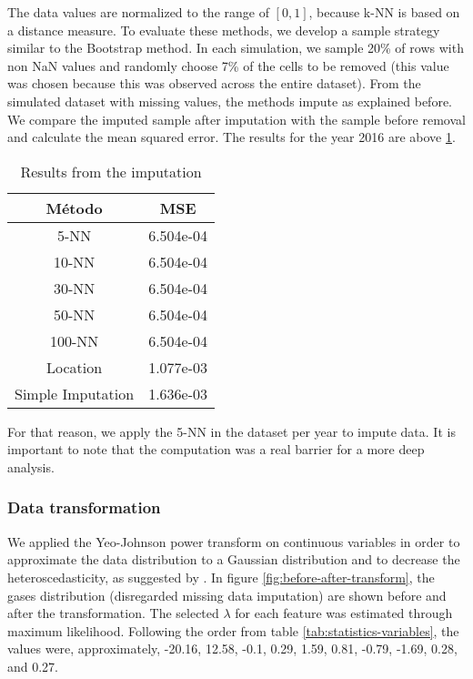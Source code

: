 The data values are normalized to the range of $[0,1]$, because k-NN is based
on a distance measure. To evaluate these methods, we develop a sample strategy
similar to the Bootstrap method. In each simulation, we sample 20\% of rows with
non NaN values and randomly choose 7\% of the cells to be removed (this value
was chosen because this was observed across the entire dataset). From the simulated
dataset with missing values, the methods impute as explained before. We
compare the imputed sample after imputation with the sample before removal and calculate
the mean squared error. The results for the year 2016 are above \ref{tab:result-imputation}. 

\begin{table}[!hb]
    \centering
    \begin{tabular}{|c|c|}
    \hline
    \textbf{Método}   & \textbf{MSE} \\ \hline
    5-NN              & 6.504e-04    \\ \hline
    10-NN             & 6.504e-04    \\ \hline
    30-NN             & 6.504e-04    \\ \hline
    50-NN             & 6.504e-04    \\ \hline
    100-NN            & 6.504e-04    \\ \hline
    Location          & 1.077e-03    \\ \hline
    Simple Imputation & 1.636e-03    \\ \hline
    \end{tabular}
    \caption{Results from the imputation}
    \label{tab:result-imputation}
\end{table}

For that reason, we apply the 5-NN in the dataset per year to impute data. It
is important to note that the computation was a real barrier for a more deep
analysis. 

\subsubsection{Data transformation}

We applied the Yeo-Johnson power transform \cite{yeo2000} on continuous
variables in order to approximate the data distribution to a Gaussian
distribution and to
decrease the heteroscedasticity, as suggested by \cite{gocheva2014}. In figure
\ref{fig:before-after-transform}, the gases distribution (disregarded
missing data imputation) are shown before and after the transformation. The
selected $\lambda$ for each feature was estimated through maximum likelihood.
Following the order from table \ref{tab:statistics-variables}, the values
were, approximately, 
-20.16, 12.58, -0.1, 0.29, 1.59, 0.81, -0.79, -1.69, 0.28, and 0.27.

